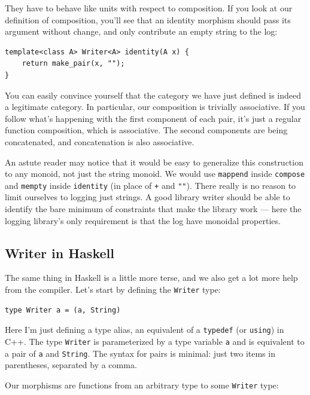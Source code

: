 They have to behave like units with respect to composition. If you look
at our definition of composition, you'll see that an identity morphism
should pass its argument without change, and only contribute an empty
string to the log:

\begin{verbatim}
template<class A> Writer<A> identity(A x) {
    return make_pair(x, "");
}
\end{verbatim}

You can easily convince yourself that the category we have just defined
is indeed a legitimate category. In particular, our composition is
trivially associative. If you follow what's happening with the first
component of each pair, it's just a regular function composition, which
is associative. The second components are being concatenated, and
concatenation is also associative.

An astute reader may notice that it would be easy to generalize this
construction to any monoid, not just the string monoid. We would use
\texttt{mappend} inside \texttt{compose} and \texttt{mempty} inside
\texttt{identity} (in place of \texttt{+} and \texttt{""}). There really
is no reason to limit ourselves to logging just strings. A good library
writer should be able to identify the bare minimum of constraints that
make the library work --- here the logging library's only requirement is
that the log have monoidal properties.

\subsection{Writer in Haskell}\label{writer-in-haskell}

The same thing in Haskell is a little more terse, and we also get a lot
more help from the compiler. Let's start by defining the \texttt{Writer}
type:

\begin{verbatim}
type Writer a = (a, String)
\end{verbatim}

Here I'm just defining a type alias, an equivalent of a \texttt{typedef}
(or \texttt{using}) in C++. The type \texttt{Writer} is parameterized by
a type variable \texttt{a} and is equivalent to a pair of \texttt{a} and
\texttt{String}. The syntax for pairs is minimal: just two items in
parentheses, separated by a comma.

Our morphisms are functions from an arbitrary type to some
\texttt{Writer} type:

